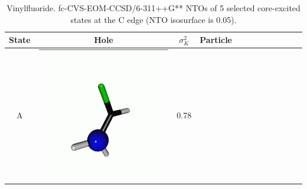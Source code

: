 \documentclass[journal=jctcce,manuscript=article]{achemso}
\begin{document}
 \begin{table}[H]
 \centering
 \caption{Vinylfluoride. fc-CVS-EOM-CCSD/6-311++G** 
 NTOs of 5 selected core-excited states at the C edge (NTO isosurface is 0.05).  \label{vinylfluoride-ntos-Cedge}}
 \vspace{3em}
 \begin{tabular}{c|ccc|cccc|cccc}
     \hline
     State &  Hole & $\sigma_K^2$ & Particle 
     \\
     \hline
     A &  
     \begin{minipage}{0.2\textwidth}
         \centering
         \includegraphics[scale=0.10]{NTO/CH2CHF/1h.png}
     \end{minipage}
     & 0.78
     &  \begin{minipage}{0.2\textwidth}
         \centering

\end{minipage}
\end{tabular}
\end{table}
\end{document}
